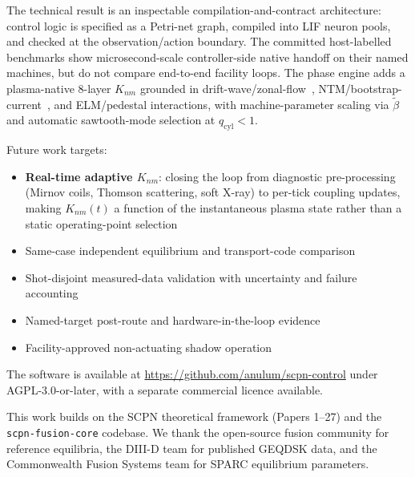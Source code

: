 \documentclass[twocolumn,preprintnumbers,amsmath,amssymb,prl,floatfix]{revtex4-2}
\begin{document}
The technical result is an inspectable compilation-and-contract architecture:
control logic is specified as a Petri-net graph, compiled into LIF neuron pools,
and checked at the observation/action boundary. The committed host-labelled
benchmarks show microsecond-scale controller-side native handoff on their named
machines, but do not compare end-to-end facility loops. The phase engine adds a
plasma-native 8-layer $K_{nm}$ grounded in
drift-wave/zonal-flow~\cite{diamond2005},
NTM/bootstrap-current~\cite{lahaye2006}, and
ELM/pedestal interactions, with machine-parameter scaling
via $\tilde{\beta}$ and automatic sawtooth-mode selection
at $q_\mathrm{cyl} < 1$.

Future work targets:
\begin{itemize}
  \item \textbf{Real-time adaptive $K_{nm}$}: closing the loop
        from diagnostic pre-processing (Mirnov coils, Thomson
        scattering, soft X-ray) to per-tick coupling updates,
        making $K_{nm}(t)$ a function of the instantaneous
        plasma state rather than a static operating-point selection
  \item Same-case independent equilibrium and transport-code comparison
  \item Shot-disjoint measured-data validation with uncertainty and failure accounting
  \item Named-target post-route and hardware-in-the-loop evidence
  \item Facility-approved non-actuating shadow operation
\end{itemize}

The software is available at \url{https://github.com/anulum/scpn-control}
under AGPL-3.0-or-later, with a separate commercial licence available.

\begin{acknowledgments}
This work builds on the SCPN theoretical framework (Papers 1--27)
and the \texttt{scpn-fusion-core} codebase.
We thank the open-source fusion community for reference equilibria,
the DIII-D team for published GEQDSK data, and the Commonwealth
Fusion Systems team for SPARC equilibrium parameters.
\end{acknowledgments}



\end{document}
